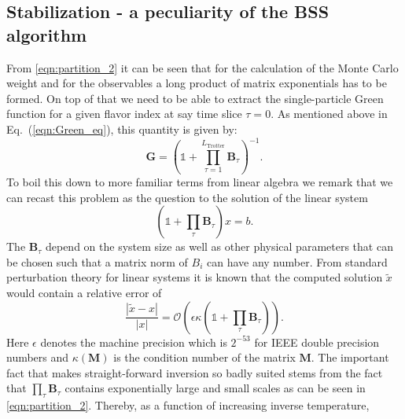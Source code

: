 %
\subsection{Stabilization - a peculiarity of the BSS algorithm}\label{sec:stable}
%
From \eqref{eqn:partition_2} it can be seen that for the calculation of the Monte Carlo weight
and for the observables a long product of matrix exponentials has to be formed.
On top of that we need to be able to extract the single-particle Green function  for a given flavor index at say time slice $\tau = 0$.  As  mentioned above in Eq.~(\ref{eqn:Green_eq}), this quantity is given by: 
\begin{equation}
\bm{G}= \left( \mathds{1} + \prod_{ \tau= 1}^{L_{\text{Trotter}}} \bm{B}_\tau \right)^{-1}.
\end{equation}
To boil this down to more familiar terms from linear algebra we remark that we can recast this problem as the question to the solution of the linear system
\begin{equation}
(\mathds{1} + \prod_\tau \bm{B}_\tau) x = b.
\end{equation}
The $\bm{B}_\tau$ depend on the system size as well as other physical parameters that can be chosen such that a matrix norm of $B_i$ can have any number.
From standard perturbation theory for linear systems it is known that the computed solution $\tilde{x}$ would 
contain a relative error of
\begin{equation}
\frac{|\tilde{x} - x|}{|x|} = \mathcal{O}\left(\epsilon \kappa(\mathds{1} + \prod_\tau \bm{B}_\tau)\right).
\end{equation}
Here $\epsilon$ denotes the machine precision which is $2^{-53}$ for IEEE double precision numbers
and $\kappa(\bm{M})$ is the condition number of the matrix $\bm{M}$.
The important fact that makes straight-forward inversion so badly suited  stems from the fact that $  \prod_ \tau \bm{B}_\tau $ contains exponentially large and small scales as can be seen in \eqref{eqn:partition_2}.  Thereby, as a function of increasing inverse temperature, 
